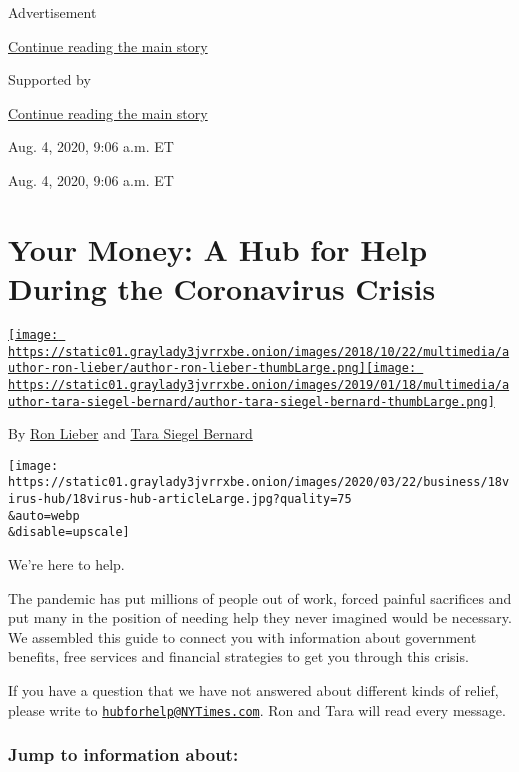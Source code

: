 Advertisement

\protect\hyperlink{after-top}{Continue reading the main story}

Supported by

\protect\hyperlink{after-sponsor}{Continue reading the main story}

Aug. 4, 2020, 9:06 a.m. ET

Aug. 4, 2020, 9:06 a.m. ET

\hypertarget{your-money-a-hub-for-help-during-the-coronavirus-crisis}{%
\section{Your Money: A Hub for Help During the Coronavirus
Crisis}\label{your-money-a-hub-for-help-during-the-coronavirus-crisis}}

\href{https://www.nytimes3xbfgragh.onion/by/ron-lieber}{\texttt{[image: https://static01.graylady3jvrrxbe.onion/images/2018/10/22/multimedia/author-ron-lieber/author-ron-lieber-thumbLarge.png]}}\href{https://www.nytimes3xbfgragh.onion/by/tara-siegel-bernard}{\texttt{[image: https://static01.graylady3jvrrxbe.onion/images/2019/01/18/multimedia/author-tara-siegel-bernard/author-tara-siegel-bernard-thumbLarge.png]}}

By \href{https://www.nytimes3xbfgragh.onion/by/ron-lieber}{Ron Lieber}
and
\href{https://www.nytimes3xbfgragh.onion/by/tara-siegel-bernard}{Tara
Siegel Bernard}

\texttt{[image: https://static01.graylady3jvrrxbe.onion/images/2020/03/22/business/18virus-hub/18virus-hub-articleLarge.jpg?quality=75\\\&auto=webp\\\&disable=upscale]}

We're here to help.

The pandemic has put millions of people out of work, forced painful
sacrifices and put many in the position of needing help they never
imagined would be necessary. We assembled this guide to connect you with
information about government benefits, free services and financial
strategies to get you through this crisis.

If you have a question that we have not answered about different kinds
of relief, please write to
\href{mailto:hubforhelp@NYTimes.com}{\nolinkurl{hubforhelp@NYTimes.com}}.
Ron and Tara will read every message.

\hypertarget{jump-to-information-about}{%
\subsubsection{Jump to information
about:}\label{jump-to-information-about}}

